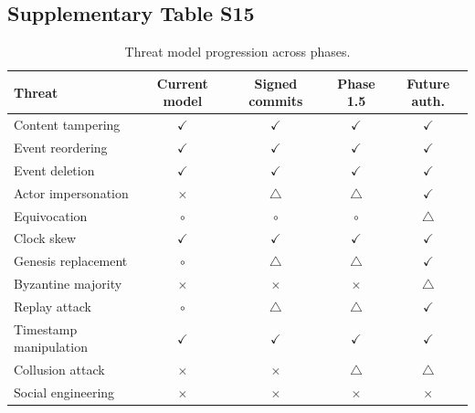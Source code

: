 \subsection{Supplementary Table S15}\label{tab:S15}
\begin{table}[htbp]
\centering
\caption{Threat model progression across phases.}
\label{tab:threat-model}
\begin{tabular}{@{}lcccc@{}}
\toprule
\textbf{Threat} & \textbf{Current model} & \textbf{Signed commits} & \textbf{Phase 1.5} & \textbf{Future auth.} \\
\midrule
Content tampering & $\checkmark$ & $\checkmark$ & $\checkmark$ & $\checkmark$ \\
Event reordering & $\checkmark$ & $\checkmark$ & $\checkmark$ & $\checkmark$ \\
Event deletion & $\checkmark$ & $\checkmark$ & $\checkmark$ & $\checkmark$ \\
Actor impersonation & $\times$ & $\triangle$ & $\triangle$ & $\checkmark$ \\
Equivocation & $\circ$ & $\circ$ & $\circ$ & $\triangle$ \\
Clock skew & $\checkmark$ & $\checkmark$ & $\checkmark$ & $\checkmark$ \\
Genesis replacement & $\circ$ & $\triangle$ & $\triangle$ & $\checkmark$ \\
Byzantine majority & $\times$ & $\times$ & $\times$ & $\triangle$ \\
Replay attack & $\circ$ & $\triangle$ & $\triangle$ & $\checkmark$ \\
Timestamp manipulation & $\checkmark$ & $\checkmark$ & $\checkmark$ & $\checkmark$ \\
Collusion attack & $\times$ & $\times$ & $\triangle$ & $\triangle$ \\
Social engineering & $\times$ & $\times$ & $\times$ & $\times$ \\
\bottomrule
\end{tabular}
\end{table}

